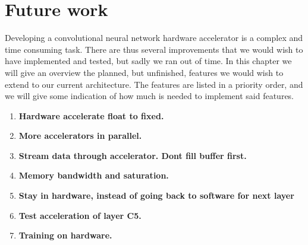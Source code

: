 \chapter{Future work}

Developing a convolutional neural network hardware accelerator is a complex and time consuming task. There are thus several improvements that we would wish to have implemented and tested, but sadly we ran out of time. In this chapter we will give an overview the planned, but unfinished, features we would wish to extend to our current architecture. The features are listed in a priority order, and we will give some indication of how much is needed to implement said features.


\begin{enumerate}                           

\item \textbf{Hardware accelerate float to fixed.}
  
	\item \textbf{More accelerators in parallel.}
	\item \textbf{Stream data through accelerator. Dont fill buffer first.}
	\item \textbf{Memory bandwidth and saturation.}
	\item \textbf{Stay in hardware, instead of going back to software for next layer}
	\item \textbf{Test acceleration of layer C5.}
	\item \textbf{Training on hardware.}
	
\end{enumerate}
